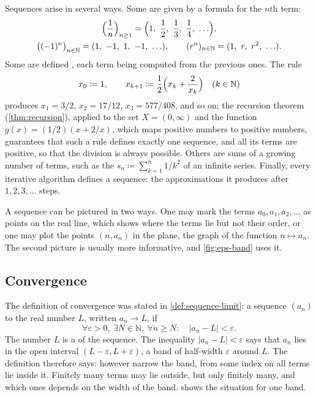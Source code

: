 Sequences arise in several ways. Some are given by a formula for the $n$th term:
\begin{gather*}
\Bigl(\frac1n\Bigr)_{n\ge1}=\Bigl(1,\ \frac12,\ \frac13,\ \frac14,\ \ldots\Bigr),\\
\bigl((-1)^n\bigr)_{n\in\mathbb N}=(1,\ -1,\ 1,\ -1,\ \ldots),\qquad(r^n)_{n\in\mathbb N}=(1,\ r,\ r^2,\ \ldots).
\end{gather*}
Some are defined , each term being computed from the previous ones. The rule
\begin{equation}
x_0\coloneqq1,\qquad x_{k+1}\coloneqq\frac12\Bigl(x_k+\frac2{x_k}\Bigr)\quad(k\in\mathbb N)
\label{eq:heron-def}
\end{equation}
produces $x_1=3/2$, $x_2=17/12$, $x_3=577/408$, and so on; the recursion theorem (\cref{thm:recursion}), applied to the set $X=(0,\infty)$ and the function $g(x)=(1/2)(x+2/x)$, which maps positive numbers to positive numbers, guarantees that such a rule defines exactly one sequence, and all its terms are positive, so that the division is always possible. Others are sums of a growing number of terms, such as the  $s_n\coloneqq\sum_{k=1}^n1/k^2$ of an infinite series. Finally, every iterative algorithm defines a sequence: the approximations it produces after $1,2,3,\ldots$ steps.

A sequence can be pictured in two ways. One may mark the terms $a_0,a_1,a_2,\ldots$ as points on the real line, which shows where the terms lie but not their order, or one may plot the points $(n,a_n)$ in the plane, the graph of the function $n\mapsto a_n$. The second picture is usually more informative, and \cref{fig:eps-band} uses it.

\subsection{Convergence}

The definition of convergence was stated in \cref{def:sequence-limit}: a sequence $(a_n)$  to the real number $L$, written $a_n\to L$, if
\begin{equation}
\forall\varepsilon>0,\ \exists N\in\mathbb N,\ \forall n\ge N:\quad|a_n-L|<\varepsilon .
\label{eq:seq-limit}
\end{equation}
The number $L$ is a  of the sequence. The inequality $|a_n-L|<\varepsilon$ says that $a_n$ lies in the open interval $(L-\varepsilon,L+\varepsilon)$, a band of half-width $\varepsilon$ around $L$. The definition therefore says: however narrow the band, from some index on all terms lie inside it. Finitely many terms may lie outside, but only finitely many, and which ones depends on the width of the band.  shows the situation for one band.

